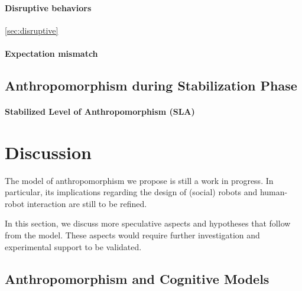\documentclass[lettersize, apacite, twoside, HRI]{apa_HRI}
\begin{document}
\paragraph{Disruptive behaviors}
\ref{sec:disruptive}

\paragraph{Expectation mismatch}

\subsection{Anthropomorphism during Stabilization Phase}
\label{sec:stabilization}

\paragraph{Stabilized Level of Anthropomorphism (SLA)}


%
%
%
%
%
%

\section{Discussion}
\label{sec:discussion}

The model of anthropomorphism we propose is still a work in progress. In
particular, its implications regarding the design of (social) robots and
human-robot interaction are still to be refined.

In this section, we discuss more speculative aspects and hypotheses that follow
from the model. These aspects would require further investigation and
experimental support to be validated.

\subsection{Anthropomorphism and Cognitive Models}
\label{sec:cognitivemodel}
\end{document}
